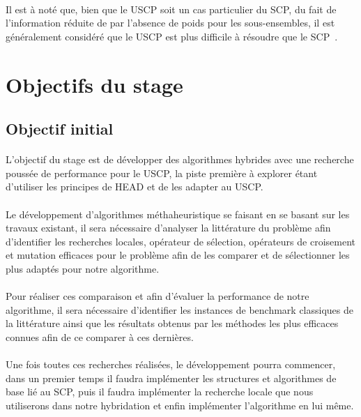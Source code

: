 \documentclass[a4paper,11pt,twoside,french,report]{../common/simplem}
\begin{document}
				\paragraph*{}
					Il est à noté que, bien que le \gls{USCP} soit un cas particulier du \gls{SCP}, du fait de l'information réduite de par l’absence de poids pour les sous-ensembles, il est généralement considéré que le \gls{USCP} est plus difficile à résoudre que le \gls{SCP}~\cite{Yelbay2015}.
		\section{Objectifs du stage}
			\subsection{Objectif initial}
				\paragraph*{}
					L'objectif du stage est de développer des algorithmes hybrides avec une recherche poussée de performance pour le \gls{USCP}, la piste première à explorer étant d'utiliser les principes de \gls{HEAD} et de les adapter au \gls{USCP}.
				\paragraph*{}
					Le développement d'algorithmes méthaheuristique se faisant en se basant sur les travaux existant, il sera nécessaire d'analyser la littérature du problème afin d'identifier les recherches locales, opérateur de sélection, opérateurs de croisement et mutation efficaces pour le problème afin de les comparer et de sélectionner les plus adaptés pour notre algorithme.
				\paragraph*{}
					Pour réaliser ces comparaison et afin d'évaluer la performance de notre algorithme, il sera nécessaire d'identifier les instances de benchmark classiques de la littérature ainsi que les résultats obtenus par les méthodes les plus efficaces connues afin de ce comparer à ces dernières.
				\paragraph*{}
					Une fois toutes ces recherches réalisées, le développement pourra commencer, dans un premier temps il faudra implémenter les structures et algorithmes de base lié au \gls{SCP}, puis il faudra implémenter la recherche locale que nous utiliserons dans notre hybridation et enfin implémenter l'algorithme en lui même.
\end{document}
